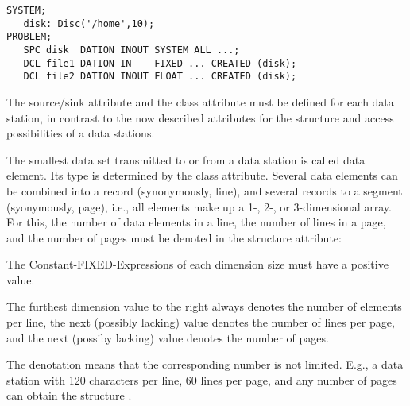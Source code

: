 \begin{lstlisting}
SYSTEM;
   disk: Disc('/home',10);
PROBLEM;
   SPC disk  DATION INOUT SYSTEM ALL ...;
   DCL file1 DATION IN    FIXED ... CREATED (disk);
   DCL file2 DATION INOUT FLOAT ... CREATED (disk);
\end{lstlisting}

The source/sink attribute and the class attribute must be defined for
each data station, in contrast to the now described attributes for the
structure and access possibilities of a data stations.

The smallest data set transmitted to or from a data station is called
data element. Its type is determined by the class attribute. Several
data elements can be combined into a record (synonymously, line), and
several records to a segment (syonymously, page), i.e., all elements
make up a 1-, 2-, or 3-dimensional array. For this, the number of data
elements in a line, the number of lines in a page, and the number of
pages must be denoted in the structure attribute:

\begin{grammarframe}



\end{grammarframe}


The Constant-FIXED-Expressions of each dimension size
 must have a positive value.

The furthest dimension value to the right always denotes the number of
elements per line,
 the next (possibly lacking) value denotes
the number of lines per page, and the next (possiby lacking)
value denotes the number of pages.

The denotation \code{*} means that
the corresponding number is not limited. E.g., a data station 
with 120 characters per line, 60 lines per page, and any number of pages
can obtain the structure .

